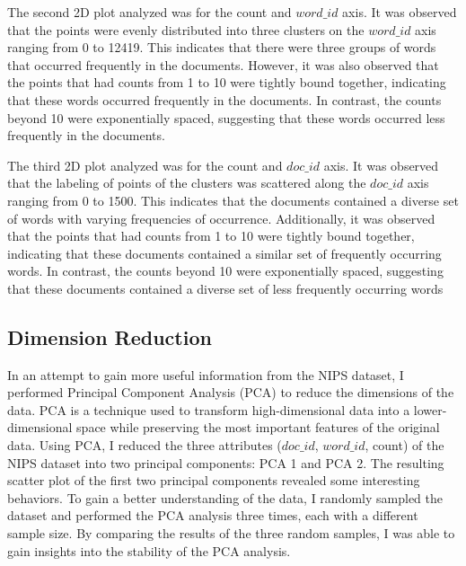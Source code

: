 \documentclass{article}
\begin{document}

The second 2D plot analyzed was for the count and $word\_id$ axis. It was observed that the points were evenly distributed into three clusters on the $word\_id$ axis ranging from 0 to 12419. This indicates that there were three groups of words that occurred frequently in the documents. However, it was also observed that the points that had counts from 1 to 10 were tightly bound together, indicating that these words occurred frequently in the documents. In contrast, the counts beyond 10 were exponentially spaced, suggesting that these words occurred less frequently in the documents.

The third 2D plot analyzed was for the count and $doc\_id$ axis. It was observed that the labeling of points of the clusters was scattered along the $doc\_id$ axis ranging from 0 to 1500. This indicates that the documents contained a diverse set of words with varying frequencies of occurrence. Additionally, it was observed that the points that had counts from 1 to 10 were tightly bound together, indicating that these documents contained a similar set of frequently occurring words. In contrast, the counts beyond 10 were exponentially spaced, suggesting that these documents contained a diverse set of less frequently occurring words
\subsection{Dimension Reduction}

In an attempt to gain more useful information from the NIPS dataset, I performed Principal Component Analysis (PCA) to reduce the dimensions of the data. PCA is a technique used to transform high-dimensional data into a lower-dimensional space while preserving the most important features of the original data\cite{medium_kmeans}. Using PCA, I reduced the three attributes ($doc\_id$, $word\_id$, count) of the NIPS dataset into two principal components: PCA 1 and PCA 2. The resulting scatter plot of the first two principal components revealed some interesting behaviors. To gain a better understanding of the data, I randomly sampled the dataset and performed the PCA analysis three times, each with a different sample size. By comparing the results of the three random samples, I was able to gain insights into the stability of the PCA analysis.
\end{document}
